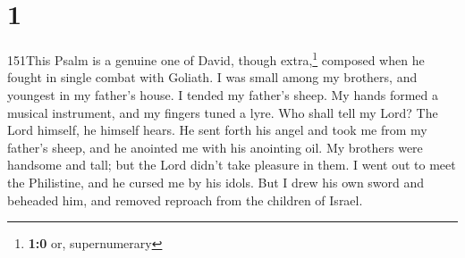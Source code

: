 \hypertarget{section}{%
\section{1}\label{section}}

151This Psalm is a genuine one of David, though extra,\footnote{\textbf{1:0}
  or, supernumerary} composed when he fought in single combat with
Goliath.  I was small among my brothers, and youngest in
my father's house. I tended my father's sheep.  My hands
formed a musical instrument, and my fingers tuned a lyre. 
Who shall tell my Lord? The Lord himself, he himself hears.
 He sent forth his angel and took me from my father's
sheep, and he anointed me with his anointing oil.  My
brothers were handsome and tall; but the Lord didn't take pleasure in
them.  I went out to meet the Philistine, and he cursed me
by his idols.  But I drew his own sword and beheaded him,
and removed reproach from the children of Israel.
